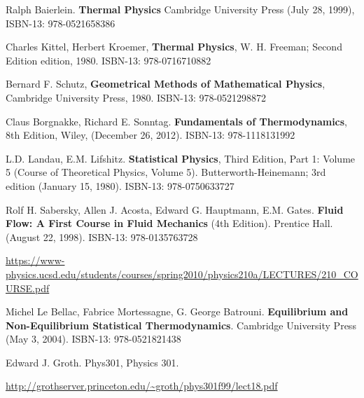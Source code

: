 \documentclass[10pt]{amsart}
\begin{document}
\begin{thebibliography}{9}

Ralph Baierlein. \textbf{Thermal Physics} Cambridge University Press (July 28, 1999), ISBN-13: 978-0521658386

Charles Kittel, Herbert Kroemer, \textbf{Thermal Physics}, W. H. Freeman; Second Edition edition, 1980. 
ISBN-13: 978-0716710882

Bernard F. Schutz, \textbf{Geometrical Methods of Mathematical Physics}, Cambridge University Press, 1980.
ISBN-13: 978-0521298872

Claus Borgnakke, Richard E. Sonntag.  \textbf{Fundamentals of Thermodynamics}, 8th Edition, Wiley, (December 26, 2012). 
ISBN-13: 978-1118131992  

L.D. Landau, E.M. Lifshitz.  \textbf{Statistical Physics}, Third Edition, Part 1: Volume 5 (Course of Theoretical Physics, Volume 5). Butterworth-Heinemann; 3rd edition (January 15, 1980).  ISBN-13: 978-0750633727

Rolf H. Sabersky, Allen J. Acosta, Edward G. Hauptmann, E.M. Gates.  \textbf{Fluid Flow: A First Course in Fluid Mechanics} (4th Edition).  Prentice Hall. (August 22, 1998).  ISBN-13: 978-0135763728


\url{https://www-physics.ucsd.edu/students/courses/spring2010/physics210a/LECTURES/210_COURSE.pdf}


Michel Le Bellac, Fabrice Mortessagne, G. George Batrouni.  \textbf{Equilibrium and Non-Equilibrium Statistical Thermodynamics}.  Cambridge University Press (May 3, 2004).  ISBN-13: 978-0521821438

Edward J. Groth. Phys301, Physics 301.  

\url{http://grothserver.princeton.edu/~groth/phys301f99/lect18.pdf}

\end{thebibliography}



\end{document}
